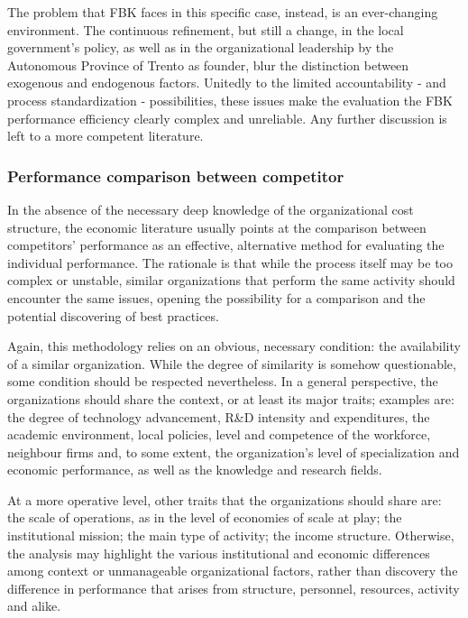 The problem that FBK faces in this specific case, instead, is an ever-changing environment. The continuous refinement, but still a change, in the local government's policy, as well as in the organizational leadership by the Autonomous Province of Trento as founder, blur the distinction between exogenous and endogenous factors. Unitedly to the limited accountability - and process standardization - possibilities, these issues make the evaluation the FBK performance efficiency clearly complex and unreliable. Any further discussion is left to a more competent literature.

\subsubsection{Performance comparison between competitor}

In the absence of the necessary deep knowledge of the organizational cost structure, the economic literature usually points at the comparison between competitors' performance as an effective, alternative method for evaluating the individual performance. The rationale is that while the process itself may be too complex or unstable, similar organizations that perform the same activity should encounter the same issues, opening the possibility for a comparison and the potential discovering of best practices.

Again, this methodology relies on an obvious, necessary condition: the availability of a similar organization. While the degree of similarity is somehow questionable, some condition should be respected nevertheless. In a general perspective, the organizations should share the context, or at least its major traits; examples are: the degree of technology advancement, R\&D intensity and expenditures, the academic environment, local policies, level and competence of the workforce, neighbour firms and, to some extent, the organization's level of specialization and economic performance, as well as the knowledge and research fields.

At a more operative level, other traits that the organizations should share are: the scale of operations, as in the level of economies of scale at play; the institutional mission; the main type of activity; the income structure. Otherwise, the analysis may highlight the various institutional and economic differences among context or unmanageable organizational factors, rather than discovery the difference in performance that arises from structure, personnel, resources, activity and alike.

